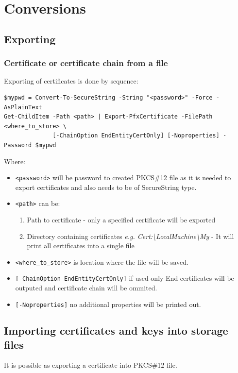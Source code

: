 \documentclass[10pt, a4paper]{report}
\begin{document}
{\section{Conversions}

  \subsection{Exporting}
  
    \subsubsection{Certificate or certificate chain from a file}
Exporting of certificates is done by sequence:
\begin{verbatim}
$mypwd = Convert-To-SecureString -String "<password>" -Force -AsPlainText
Get-ChildItem -Path <path> | Export-PfxCertificate -FilePath <where_to_store> \
              [-ChainOption EndEntityCertOnly] [-Noproperties] -Password $mypwd
\end{verbatim}

Where:
\begin{itemize}
\item \verb+<password>+ will be password to created PKCS\#12 file as it is needed to export certificates and also needs to be of SecureString type.
\item \verb+<path>+ can be:
\begin{enumerate}
\item Path to certificate - only a specified certificate will be exported
\item Directory containing certificates \textit{e.g. Cert:{\textbackslash}LocalMachine{\textbackslash}My} - It will print all certificates into a single file
\end{enumerate}
\item \verb+<where_to_store>+ is location where the file will be saved.
\item \verb+[-ChainOption EndEntityCertOnly]+ if used only End certificates will be outputed and certificate chain will be ommited.
\item \verb+[-Noproperties]+ no additional properties will be printed out.
\end{itemize}

  \subsection{Importing certificates and keys into storage files}
It is possible as exporting a certificate into PKCS\#12 file.
  
}
\end{document}
